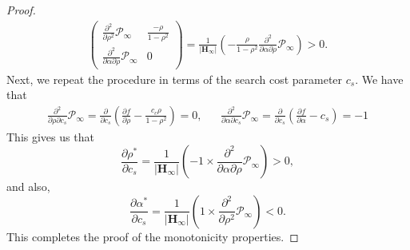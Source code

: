\documentclass[12pt]{article}
\theoremstyle{definition}
\theoremstyle{remark}
\begin{document}
\begin{proof}
\begin{align*}
\begin{pmatrix}
        \frac{\partial^2}{\partial \rho^2 } \mathcal{P}_\infty & \frac{-\rho}{1-\rho^2} \\
        \frac{\partial^2}{\partial \alpha \partial \rho } \mathcal{P}_\infty & 0
    \end{pmatrix} = \frac{1}{|\mathbf{H}_\infty|} \left( -\frac{\rho}{1-\rho^2} \frac{\partial^2}{\partial \alpha \partial \rho } \mathcal{P}_\infty \right) > 0.
\end{align*}
Next, we repeat the procedure in terms of the search cost parameter $c_s$. We have that
\begin{align*}
    \frac{\partial^2}{\partial \rho \partial c_s} \mathcal{P}_\infty = \frac{\partial}{\partial c_s} \left( \frac{\partial f}{\partial \rho} - \frac{c_c \rho}{1-\rho^2} \right) = 0, &&
    \frac{\partial^2}{\partial \alpha \partial c_s} \mathcal{P}_\infty = \frac{\partial}{\partial c_s} \left( \frac{\partial f}{\partial \alpha} - c_s \right) = -1
\end{align*}
This gives us that
\begin{equation*}
    \frac{\partial \rho^*}{\partial c_s} = \frac{1}{|\mathbf{H}_\infty|} \left( -1 \times \frac{\partial^2}{\partial \alpha \partial \rho } \mathcal{P}_\infty \right)> 0,
\end{equation*}
and also,
\begin{equation*}
    \frac{\partial \alpha^*}{\partial c_s} = \frac{1}{|\mathbf{H}_\infty|} \left( 1 \times \frac{\partial^2}{\partial \rho^2 } \mathcal{P}_\infty \right) < 0.
\end{equation*}
This completes the proof of the monotonicity properties.


\end{proof}
\end{document}
